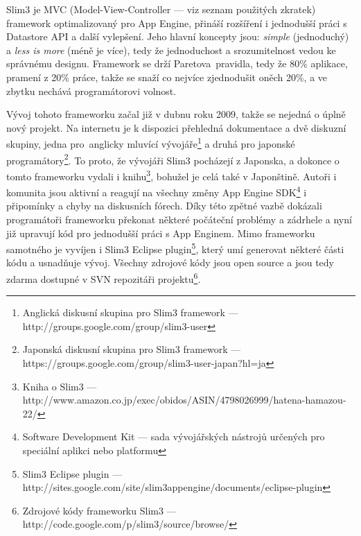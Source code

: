Slim3 \cite{web:slim3} je MVC (Model-View-Controller --- viz seznam použitých zkratek) framework optimalizovaný pro App Engine, přináší rozšíření i jednodušší práci s Datastore API a další vylepšení. Jeho hlavní koncepty jsou: \emph{simple} (jednoduchý) a \emph{less is more} (méně je více), tedy že jednoduchost a srozumitelnost vedou ke správnému designu. Framework se drží Paretova~pravidla, tedy že 80\% aplikace, pramení z 20\% práce, takže se snaží co nejvíce zjednodušit oněch 20\%, a ve zbytku nechává programátorovi volnost.

Vývoj tohoto frameworku začal  již v dubnu roku 2009, takže se nejedná o úplně nový projekt. Na internetu je k dispozici přehledná dokumentace a dvě diskuzní skupiny, jedna pro~anglicky mluvící vývojáře\footnote{Anglická diskusní skupina pro Slim3 framework ---http://groups.google.com/group/slim3-user} a druhá pro japonské programátory\footnote{Japonská diskusní skupina pro Slim3 framework --- https://groups.google.com/group/slim3-user-japan?hl=ja}. To proto, že vývojáři Slim3 pocházejí z Japonska, a dokonce o tomto frameworku vydali i knihu\footnote{Kniha o Slim3 --- http://www.amazon.co.jp/exec/obidos/ASIN/4798026999/hatena-hamazou-22/}, bohužel je celá také v Japonštině. Autoři i komunita jsou aktivní a reagují na všechny změny App Engine SDK\footnote{Software Development Kit --- sada vývojářských nástrojů určených pro speciální aplikci nebo platformu} i připomínky a chyby na diskusních fórech. Díky této zpětné vazbě dokázali programátoři frameworku překonat některé počáteční problémy a zádrhele a nyní již upravují kód pro jednodušší práci s App Enginem. Mimo frameworku samotného je vyvíjen i Slim3 Eclipse plugin\footnote{Slim3 Eclipse plugin --- http://sites.google.com/site/slim3appengine/documents/eclipse-plugin}, který umí generovat některé části kódu a usnadňuje vývoj. Všechny zdrojové kódy jsou open source a jsou tedy zdarma dostupné v SVN repozitáři projektu\footnote{Zdrojové kódy frameworku Slim3 --- http://code.google.com/p/slim3/source/browse/}.

